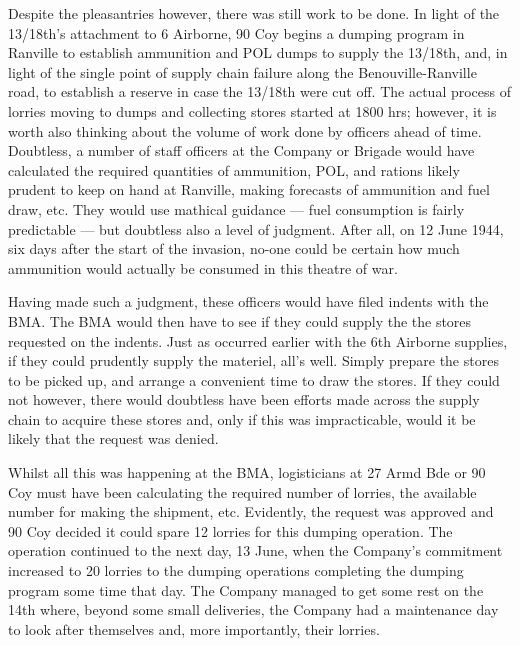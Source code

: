 \documentclass[noraggedright]{turabian-researchpaper}
\begin{document}
Despite the pleasantries however, there was still work to be done. In light of 
the 13/18th's attachment to 6 Airborne, 90 Coy begins a dumping program in 
Ranville to establish ammunition and POL dumps to supply the 13/18th, and, in 
light of the single point of supply chain failure along the Benouville-Ranville
road, to establish a reserve in case the 13/18th were cut off.\autocite
[12 June 1944] {90wd}  The actual process of lorries moving to dumps and 
collecting stores started at 1800 hrs; however, it is worth also thinking about
the volume of work done by officers ahead of time.  Doubtless, a number of 
staff officers at the Company or Brigade would have calculated the required 
quantities of ammunition, POL, and rations likely prudent to keep on hand at 
Ranville, making forecasts of ammunition and fuel draw, etc.  They would use
mathical guidance --- fuel consumption is fairly predictable --- but doubtless
also a level of judgment.  After all, on 12 June 1944, six days after the
start of the invasion, no-one could be certain how much ammunition would
actually be consumed in this theatre of war.  

Having made such a judgment, these officers would have filed indents with
the BMA.  %
The BMA would then have to see if they could supply the the stores requested
on the indents.  Just as occurred earlier with the 6th Airborne supplies, if 
they could prudently supply the materiel, all's well.  Simply prepare the
stores to be picked up, and arrange a convenient time to draw the stores.  If
they could not however, there would doubtless have been efforts made across the
supply chain to acquire these stores and, only if this was impracticable, would 
it be likely that the request was denied.

Whilst all this was happening at the BMA, logisticians at 27 Armd Bde or 90
Coy must have been calculating the required number of lorries, the available
number for making the shipment, etc.  Evidently, the request was approved and
90 Coy decided it could spare 12 lorries for this dumping operation.\autocite
[12 June 1944]{90wd}  The operation continued to the next day, 13 June, when
 the Company's commitment increased to 20 lorries %
to the dumping operations completing the dumping program some time that day.  
The Company managed to get some rest on the 14th where, beyond some small 
deliveries, the Company had a maintenance day to look after themselves and, 
more importantly, their lorries.\autocite[14 June 1944]{90wd} 
\end{document}
